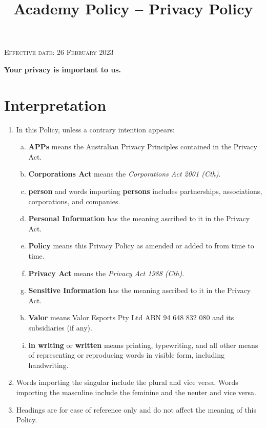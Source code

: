 \documentclass[10pt]{article}
\begin{document}
\title{Academy Policy -- Privacy Policy}

\textsc{Effective date: 26 February 2023}

\textbf{Your privacy is important to us.}


\section{Interpretation}

\begin{enumerate}[(1)]
\item 
In this Policy, unless a contrary intention appears:
	\begin{enumerate}[(a)]
	\item
	\textbf{APPs} means the Australian Privacy Principles contained in the Privacy Act.
	
	\item
	\textbf{Corporations Act} means the \textit{Corporations Act 2001 (Cth)}.
	
	\item
	\textbf{person} and words importing \textbf{persons} includes partnerships, associations, corporations, and companies.
	
	\item
	\textbf{Personal Information} has the meaning ascribed to it in the Privacy Act.
	
	\item
	\textbf{Policy} means this Privacy Policy as amended or added to from time to time.
	
	\item
	\textbf{Privacy Act} means the \textit{Privacy Act 1988 (Cth)}.
	
	\item
	\textbf{Sensitive Information} has the meaning ascribed to it in the Privacy Act.
	
	\item
	\textbf{Valor} means Valor Esports Pty Ltd ABN 94 648 832 080 and its subsidiaries (if any).
	
	\item
	\textbf{in writing} or \textbf{written} means printing, typewriting, and all other means of representing or reproducing words in visible form, including handwriting.
	\end{enumerate}

\item
Words importing the singular include the plural and vice versa. Words importing the masculine include the feminine and the neuter and vice versa.

\item
Headings are for ease of reference only and do not affect the meaning of this Policy.
\end{enumerate}
\end{document}
